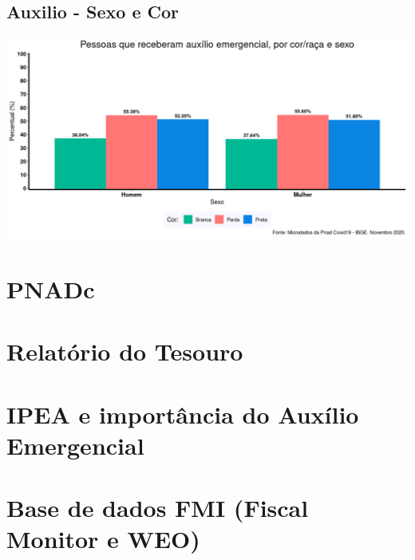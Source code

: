 \documentclass{SelfArx}
\begin{document}
\subsection*{Auxilio - Sexo e Cor}
\label{sec:orge56b5d0}
\begin{center}
\includegraphics[width=.9\linewidth]{./figs/PNAD_COVID/auxilio_cor_sexo.png}
\end{center}

\section*{PNADc}
\label{sec:org0d98344}

\section*{Relatório do Tesouro}
\label{sec:org39a66b5}

\section*{IPEA e importância do Auxílio Emergencial}
\label{sec:org355bd03}

\section*{Base de dados FMI (Fiscal Monitor e WEO)}
\label{sec:org09822ce}
\end{document}
